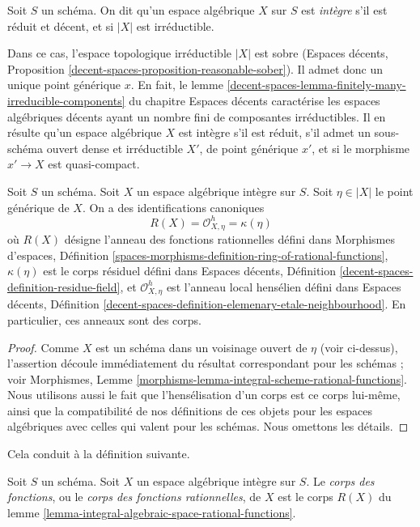 \begin{definition}
\label{definition-integral-algebraic-space}
Soit $S$ un schéma. On dit qu'un espace algébrique $X$ sur $S$ est
{\it intègre} s'il est réduit et décent, et si $|X|$ est irréductible.
\end{definition}

\noindent
Dans ce cas, l'espace topologique irréductible $|X|$ est sobre
(Espaces décents, Proposition \ref{decent-spaces-proposition-reasonable-sober}).
Il admet donc un unique point générique $x$. En fait, le lemme
\ref{decent-spaces-lemma-finitely-many-irreducible-components} du chapitre
Espaces décents caractérise les espaces algébriques décents
ayant un nombre fini de
composantes irréductibles. Il en résulte qu'un
espace algébrique $X$ est intègre s'il est
réduit, s'il admet un sous-schéma ouvert dense et irréductible $X'$,
de point générique $x'$, et si le morphisme $x' \to X$ est quasi-compact.

\begin{lemma}
\label{lemma-integral-algebraic-space-rational-functions}
Soit $S$ un schéma. Soit $X$ un espace algébrique intègre sur $S$.
Soit $\eta \in |X|$ le point générique de $X$.
On a des identifications canoniques
$$
R(X) = \mathcal{O}_{X, \eta}^h = \kappa(\eta)
$$
où $R(X)$ désigne l'anneau des fonctions rationnelles défini dans
Morphismes d'espaces, Définition
\ref{spaces-morphisms-definition-ring-of-rational-functions},
$\kappa(\eta)$ est le corps résiduel défini dans
Espaces décents, Définition \ref{decent-spaces-definition-residue-field},
et $\mathcal{O}_{X, \eta}^h$ est l'anneau local hensélien défini dans
Espaces décents, Définition
\ref{decent-spaces-definition-elemenary-etale-neighbourhood}.
En particulier, ces anneaux sont des corps.
\end{lemma}

\begin{proof}
Comme $X$ est un schéma dans un voisinage ouvert de $\eta$ (voir ci-dessus),
l'assertion découle immédiatement du résultat correspondant pour
les schémas ; voir Morphismes, Lemme
\ref{morphisms-lemma-integral-scheme-rational-functions}.
Nous utilisons aussi le fait que l'hensélisation d'un corps est ce corps lui-même,
ainsi que la compatibilité de nos définitions de ces objets
pour les espaces algébriques avec celles qui valent pour les schémas.
Nous omettons les détails.
\end{proof}

\noindent
Cela conduit à la définition suivante.

\begin{definition}
\label{definition-function-field}
Soit $S$ un schéma. Soit $X$ un espace algébrique intègre sur $S$.
Le {\it corps des fonctions}, ou le {\it corps des fonctions rationnelles},
de $X$ est le corps $R(X)$ du
lemme \ref{lemma-integral-algebraic-space-rational-functions}.
\end{definition}

